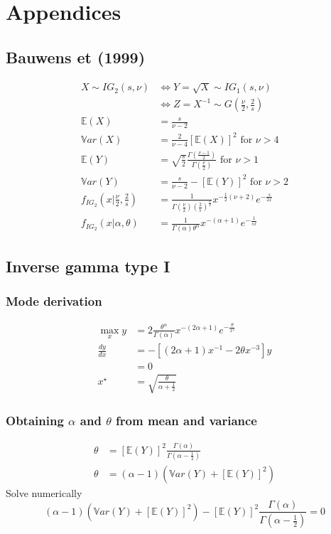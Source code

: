 \documentclass{article}
\begin{document}
\section*{Appendices}
\subsection*{Bauwens et (1999)}

\begin{align*}
X \sim IG_2(s, \nu) &\Leftrightarrow Y = \sqrt{X} \sim IG_1(s, \nu)\\
& \Leftrightarrow Z = X^{-1} \sim G(\frac{\nu}{2}, \frac{2}{s})\\
\mathbb{E}(X) &= \frac{s}{\nu - 2}\\
\mathbb{V}ar(X) &= \frac{2}{\nu - 4}[\mathbb{E}(X)]^2 \mbox{ for }\nu > 4\\
\mathbb{E}(Y) &= \sqrt{\frac{s}{2}}\frac{\Gamma\left(\frac{\nu
-1}{2}\right)}{\Gamma\left(\frac{\nu}{2}\right)} \mbox{ for }\nu > 1 \\
\mathbb{V}ar(Y) &= \frac{s}{\nu - 2} - [\mathbb{E}(Y)]^2 \mbox{ for }\nu > 2\\
f_{IG_2}(x|\frac{\nu}{2}, \frac{2}{s}) &= \frac{1}{\Gamma(\frac{\nu}{2})\left(\frac{2}{s}\right)^{\frac{\nu}{2}}}x^{-\frac{1}{2}(\nu+2)}e^{-\frac{s}{2x}}    \\
f_{IG_2}(x|\alpha,\theta) &=
                                  \frac{1}{\Gamma(\alpha)\theta^\alpha}
                                  x^{-(\alpha+1)}e^{-\frac{1}{sx}}    
\end{align*}

\subsection*{Inverse gamma type I}
\subsubsection*{Mode derivation}
\begin{align*}
  \max_x y &=
             2\frac{\theta^\alpha}{\Gamma(\alpha)}x^{-(2\alpha+1)}e^{-\frac{\theta}{x^2}}\\
  \frac{dy}{dx} &= -\left[(2\alpha+1)x^{-1}-2\theta x^{-3}\right]y\\
           &= 0\\
  x^\star &= \sqrt{\frac{\theta}{\alpha + \frac{1}{2}}}
\end{align*}
\subsubsection*{Obtaining $\alpha$ and $\theta$ from mean and
  variance}
\begin{align*}
  \theta &=
  \left[\mathbb{E}(Y)\right]^2\frac{\Gamma(\alpha)}{\Gamma(\alpha-\frac{1}{2})}\\
  \theta &= (\alpha - 1)\left(\mathbb{V}ar(Y) + [\mathbb{E}(Y)]^2\right)
\end{align*}
Solve numerically
\[
(\alpha - 1)\left(\mathbb{V}ar(Y) + [\mathbb{E}(Y)]^2\right)-
\left[\mathbb{E}(Y)\right]^2\frac{\Gamma(\alpha)}{\Gamma(\alpha-\frac{1}{2})} =0
\]
\end{document}
